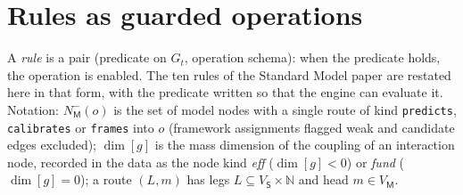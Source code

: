 \documentclass[11pt,a4paper,twoside,openany]{report}
\theoremstyle{plain}
\theoremstyle{definition}
\theoremstyle{remark}
\newcommand{\lay}[1]{\mathsf{#1}}
\newcommand{\VS}{V_{\lay S}}\newcommand{\VM}{V_{\lay M}}\newcommand{\VO}{V_{\lay O}}
\newcommand{\id}[1]{\texttt{#1}}
\begin{document}
\section{Rules as guarded operations}
A \emph{rule} is a pair (predicate on $G_t$, operation schema): when the predicate holds, the operation is enabled. The ten rules of the Standard Model paper are restated here in that form, with the predicate written so that the engine can evaluate it. Notation: $N^-_{\lay M}(o)$ is the set of model nodes with a single route of kind \id{predicts}, \id{calibrates} or \id{frames} into $o$ (framework assignments flagged weak and candidate edges excluded); $\dim[g]$ is the mass dimension of the coupling of an interaction node, recorded in the data as the node kind \emph{eff} ($\dim[g]<0$) or \emph{fund} ($\dim[g]=0$); a route $(L,m)$ has legs $L\subseteq\VS\times\mathbb N$ and head $m\in\VM$.
\end{document}
